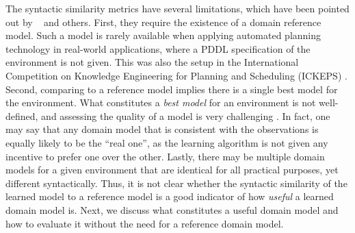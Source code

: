 The syntactic similarity metrics have several limitations, which have been pointed out by ~\cite{garrido2024challenges} and others. 
First, they require the existence of a domain reference model. 
Such a model is rarely available when applying automated planning technology in real-world applications, where a PDDL specification of the environment is not given. 
This was also the setup in the International Competition on Knowledge Engineering for Planning and Scheduling (ICKEPS) \citep{DBLP:journals/aim/ChrpaMVV17}. 
Second, comparing to a reference model implies there is a single best model for the environment. 
What constitutes a \emph{best model} for an environment is not well-defined, and assessing the quality of a model is very challenging \citep{DBLP:conf/kcap/McCluskeyVV17}. 
In fact, one may say that any domain model that is consistent with the observations is equally likely to be the ``real one'', as the learning algorithm is not given any incentive to prefer one over the other. 
Lastly, there may be multiple domain models for a given environment that are identical for all practical purposes, yet different syntactically. 
Thus, it is not clear whether the syntactic similarity of the learned model to a reference model is a good indicator of how \emph{useful} a learned domain model is. 
Next, we discuss what constitutes a useful domain model and how to evaluate it without the need for a reference domain model.




